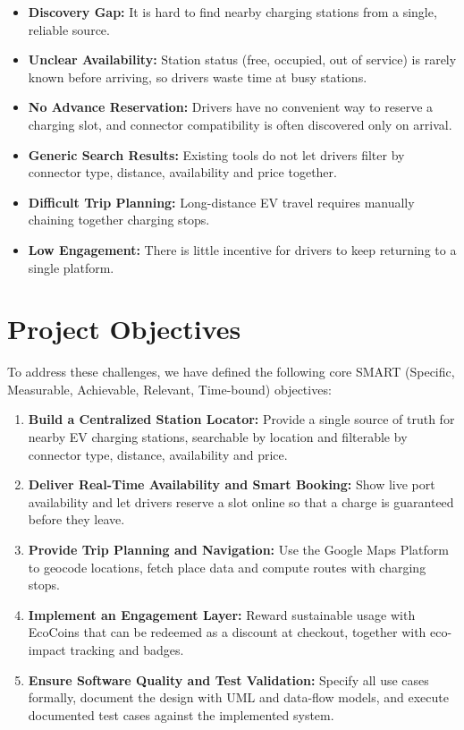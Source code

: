 \documentclass{tietreport}
\begin{document}
\begin{itemize}
  \item \textbf{Discovery Gap:} It is hard to find nearby
    charging stations from a single, reliable source.
  \item \textbf{Unclear Availability:} Station status
    (free, occupied, out of service) is rarely known
    before arriving, so drivers waste time at busy
    stations.
  \item \textbf{No Advance Reservation:} Drivers have no
    convenient way to reserve a charging slot, and
    connector compatibility is often discovered only on
    arrival.
  \item \textbf{Generic Search Results:} Existing tools do
    not let drivers filter by connector type, distance,
    availability and price together.
  \item \textbf{Difficult Trip Planning:} Long-distance EV
    travel requires manually chaining together charging
    stops.
  \item \textbf{Low Engagement:} There is little
    incentive for drivers to keep returning to a single
    platform.
\end{itemize}

\section{Project Objectives}

To address these challenges, we have defined the
following core SMART (Specific, Measurable, Achievable,
Relevant, Time-bound) objectives:

\begin{enumerate}
  \item \textbf{Build a Centralized Station Locator:}
    Provide a single source of truth for nearby EV
    charging stations, searchable by location and
    filterable by connector type, distance,
    availability and price.
  \item \textbf{Deliver Real-Time Availability and Smart
    Booking:} Show live port availability and let
    drivers reserve a slot online so that a charge is
    guaranteed before they leave.
  \item \textbf{Provide Trip Planning and Navigation:}
    Use the Google Maps Platform to geocode locations,
    fetch place data and compute routes with charging
    stops.
  \item \textbf{Implement an Engagement Layer:} Reward
    sustainable usage with EcoCoins that can be
    redeemed as a discount at checkout, together with
    eco-impact tracking and badges.
  \item \textbf{Ensure Software Quality and Test
    Validation:} Specify all use cases formally,
    document the design with UML and data-flow models,
    and execute documented test cases against the
    implemented system.
\end{enumerate}
\end{document}
